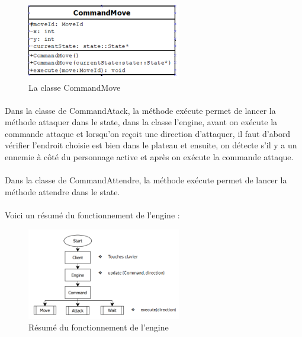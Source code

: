\documentclass[a4paper,12pt]{article}
\begin{document}
\begin{figure}[ht]
\begin{center}
\includegraphics[width=0.6\textwidth]{CommandMove.png}
\caption{\label{pacmangame}La classe CommandMove}
\end{center}
\end{figure}

\paragraph{}
Dans la classe de CommandAtack, la méthode exécute permet de lancer la méthode attaquer dans le state, dans la classe l'engine, avant on exécute la commande attaque et lorsqu'on reçoit une direction d'attaquer, il faut d'abord vérifier l'endroit choisie est bien dans le plateau et ensuite, on détecte s'il y a un ennemie à côté du personnage active et après on exécute la commande attaque.   

\paragraph{}
Dans la classe de CommandAttendre, la méthode exécute permet de lancer la méthode attendre dans le state.
\paragraph{}
Voici un résumé du fonctionnement de l'engine :
\begin{figure}[ht]
\begin{center}
\includegraphics[width=0.6\textwidth]{resume.png}
\caption{\label{pacmangame}Résumé du fonctionnement de l'engine}
\end{center}
\end{figure}
\end{document}
